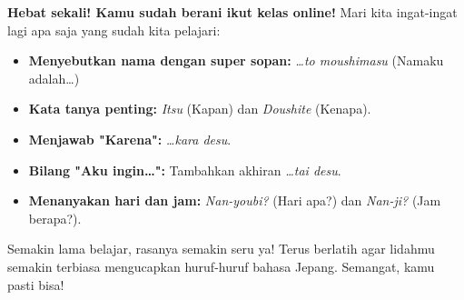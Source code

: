 \vspace{2em}
\begin{tcolorbox}[
    colback=blue!5!white,
    colframe=blue!80!black,
    boxrule=3pt,
    arc=5mm,
    title={\huge\bfseries \sffamily 🌟 Rangkuman Bab 4 🌟},
    fonttitle=\color{white},
    attach boxed title to top center={yshift=-4mm},
    boxed title style={colback=blue!80!black, rounded corners},
    left=5mm, right=5mm, top=7mm, bottom=5mm
]
\Large \textbf{Hebat sekali! Kamu sudah berani ikut kelas online!} Mari kita ingat-ingat lagi apa saja yang sudah kita pelajari:
\begin{itemize}
    \item \textbf{Menyebutkan nama dengan super sopan:} \textit{\dots to moushimasu} (Namaku adalah\dots)
    \item \textbf{Kata tanya penting:} \textit{Itsu} (Kapan) dan \textit{Doushite} (Kenapa).
    \item \textbf{Menjawab "Karena":} \textit{\dots kara desu}.
    \item \textbf{Bilang "Aku ingin\dots":} Tambahkan akhiran \textit{\dots tai desu}.
    \item \textbf{Menanyakan hari dan jam:} \textit{Nan-youbi?} (Hari apa?) dan \textit{Nan-ji?} (Jam berapa?).
\end{itemize}
Semakin lama belajar, rasanya semakin seru ya! Terus berlatih agar lidahmu semakin terbiasa mengucapkan huruf-huruf bahasa Jepang. Semangat, kamu pasti bisa!
\end{tcolorbox}

\newpage